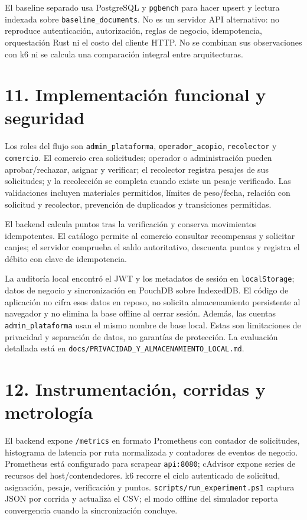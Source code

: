 \documentclass[
  spanish,
  12pt,
  a4paper,
]{article}
\begin{document}
El baseline separado usa PostgreSQL y \texttt{pgbench} para hacer upsert
y lectura indexada sobre \texttt{baseline\_documents}. No es un servidor
API alternativo: no reproduce autenticación, autorización, reglas de
negocio, idempotencia, orquestación Rust ni el costo del cliente HTTP.
No se combinan sus observaciones con k6 ni se calcula una comparación
integral entre arquitecturas.

\section{11. Implementación funcional y
seguridad}\label{implementaciuxf3n-funcional-y-seguridad}

Los roles del flujo son \texttt{admin\_plataforma},
\texttt{operador\_acopio}, \texttt{recolector} y \texttt{comercio}. El
comercio crea solicitudes; operador o administración pueden
aprobar/rechazar, asignar y verificar; el recolector registra pesajes de
sus solicitudes; y la recolección se completa cuando existe un pesaje
verificado. Las validaciones incluyen materiales permitidos, límites de
peso/fecha, relación con solicitud y recolector, prevención de
duplicados y transiciones permitidas.

El backend calcula puntos tras la verificación y conserva movimientos
idempotentes. El catálogo permite al comercio consultar recompensas y
solicitar canjes; el servidor comprueba el saldo autoritativo, descuenta
puntos y registra el débito con clave de idempotencia.

La auditoría local encontró el JWT y los metadatos de sesión en
\texttt{localStorage}; datos de negocio y sincronización en PouchDB
sobre IndexedDB. El código de aplicación no cifra esos datos en reposo,
no solicita almacenamiento persistente al navegador y no elimina la base
offline al cerrar sesión. Además, las cuentas \texttt{admin\_plataforma}
usan el mismo nombre de base local. Estas son limitaciones de privacidad
y separación de datos, no garantías de protección. La evaluación
detallada está en \texttt{docs/PRIVACIDAD\_Y\_ALMACENAMIENTO\_LOCAL.md}.

\section{12. Instrumentación, corridas y
metrología}\label{instrumentaciuxf3n-corridas-y-metrologuxeda}

El backend expone \texttt{/metrics} en formato Prometheus con contador
de solicitudes, histograma de latencia por ruta normalizada y contadores
de eventos de negocio. Prometheus está configurado para scrapear
\texttt{api:8080}; cAdvisor expone series de recursos del
host/contendedores. k6 recorre el ciclo autenticado de solicitud,
asignación, pesaje, verificación y puntos.
\texttt{scripts/run\_experiment.ps1} captura JSON por corrida y
actualiza el CSV; el modo offline del simulador reporta convergencia
cuando la sincronización concluye.
\end{document}
